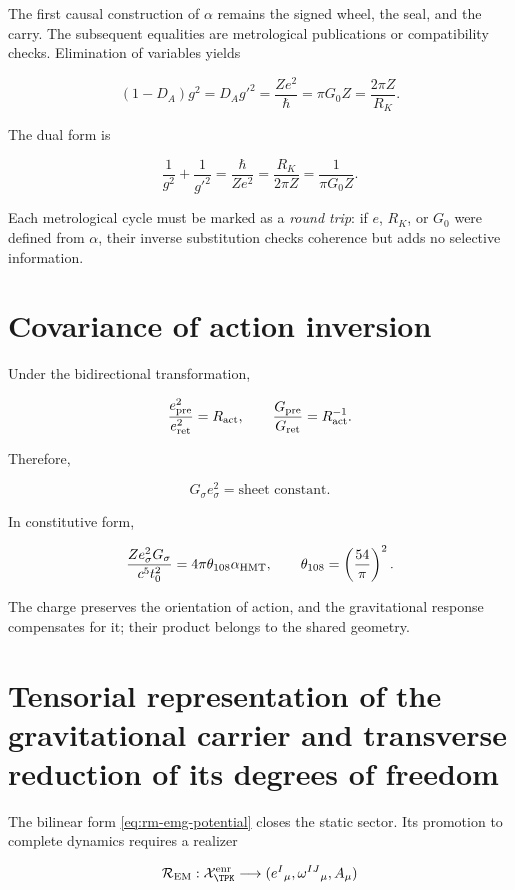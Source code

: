 The first causal construction of \(\alpha\) remains the signed wheel,
the seal, and the carry. The subsequent equalities are metrological publications
or compatibility checks. Elimination of variables yields

\[
(1-D_A)g^2=D_Ag'^2
=\frac{Ze^2}{\hbar}
=\pi G_0Z
=\frac{2\pi Z}{R_K}.
\]

The dual form is

\[
\frac1{g^2}+\frac1{g'^2}
=\frac{\hbar}{Ze^2}
=\frac{R_K}{2\pi Z}
=\frac1{\pi G_0Z}.
\]

Each metrological cycle must be marked as a \emph{round trip}: if \(e\),
\(R_K\), or \(G_0\) were defined from \(\alpha\), their inverse substitution
checks coherence but adds no selective information.

\section{Covariance of action inversion}

Under the bidirectional transformation,

\[
\frac{e_{\rm pre}^2}{e_{\rm ret}^2}=R_{\rm act},
\qquad
\frac{G_{\rm pre}}{G_{\rm ret}}=R_{\rm act}^{-1}.
\]

Therefore,

\begin{equation}
\boxed{G_{\sigma}e_{\sigma}^2=\text{sheet constant}.}
\label{eq:rm-ge2-invariant}
\end{equation}

In constitutive form,

\[
\frac{Ze_{\sigma}^2G_{\sigma}}
{c^5t_0^2}
=4\pi\theta_{108}\alpha_{\rm HMT},
\qquad
\theta_{108}=\left(\frac{54}{\pi}\right)^2.
\]

The charge preserves the orientation of action, and the gravitational response
compensates for it; their product belongs to the shared geometry.

\section{Tensorial representation of the gravitational carrier and transverse reduction of its degrees of freedom}

The bilinear form \eqref{eq:rm-emg-potential} closes the static sector. Its
promotion to complete dynamics requires a realizer

\[
\mathcal R_{\rm EM}:
\mathcal X_{\TPK}^{\rm enr}
\longrightarrow
(e^I{}_{\mu},\omega^{IJ}{}_{\mu},A_\mu)
\]


